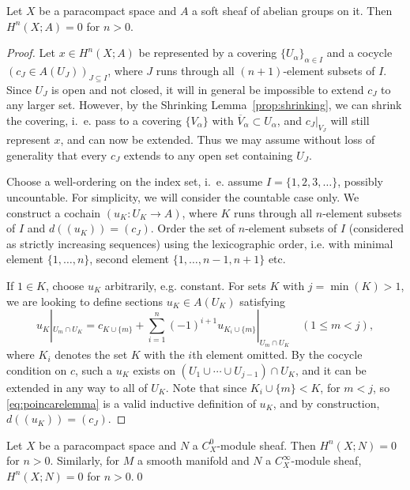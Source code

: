 \documentclass[a4paper,openany]{scrbook}
\begin{document}
\begin{prop}\label{prop:finesheafcohomology}
Let $X$ be a paracompact space and $A$ a soft sheaf of abelian groups on it. Then $H^n(X;A)=0$ for $n>0$.
\end{prop}
\begin{proof}
Let $x \in H^n(X;A)$ be represented by a covering $\{U_\alpha\}_{\alpha \in I}$ and a cocycle $(c_J \in A(U_J))_{J \subseteq I}$, where $J$ runs through all $(n+1)$-element subsets of $I$. Since $U_J$ is open and not closed, it will in general be impossible to extend $c_J$ to any larger set. However, by the Shrinking Lemma~\ref{prop:shrinking}, we can shrink the covering, i.~e. pass to a covering $\{V_\alpha\}$ with $\overline V_\alpha \subset U_\alpha$, and $c_J|_{V_J}$ will still represent $x$, and can now be extended. Thus we may assume without loss of generality that every $c_J$ extends to any open set containing $U_J$.

Choose a well-ordering on the index set, i.~e. assume $I=\{1,2,3,\dots\}$, possibly uncountable. For simplicity, we will consider the countable case only. We construct a cochain $(u_K\colon U_K \to A)$, where $K$ runs through all $n$-element subsets of $I$ and $d((u_K)) = (c_J)$. Order the set of $n$-element subsets of $I$ (considered as strictly increasing sequences) using the lexicographic order, i.e. with minimal element $\{1,\dots,n\}$, second element $\{1,\dots,n-1,n+1\}$ etc. 

If $1 \in K$, choose $u_K$ arbitrarily, e.g. constant. For sets $K$ with $j=\min(K)>1$, we are looking to define sections $u_K \in A(U_K)$ satisfying
\begin{equation}\label{eq:poincarelemma}
u_K|_{U_m \cap U_K} = c_{K\cup\{m\}}+\sum_{i=1}^{n} (-1)^{i+1} u_{K_i \cup \{m\}}|_{U_m \cap U_K} \quad (1 \leq m < j),
\end{equation}
where $K_i$ denotes the set $K$ with the $i$th element omitted. By the cocycle condition on $c$, such a $u_K$ exists on $(U_1 \cup \cdots \cup U_{j-1}) \cap U_K$, and it can be extended in any way to all of $U_K$. Note that since $K_i \cup \{m\} < K$, for $m<j$, so \eqref{eq:poincarelemma} is a valid inductive definition of $u_K$, and by construction, $d((u_K))=(c_J)$.
\end{proof}

\begin{corollary}\label{cor:Omodulecohomology}
Let $X$ be a paracompact space and $N$ a $C^0_X$-module sheaf. Then $H^n(X;N)=0$ for $n>0$. Similarly, for $M$ a smooth manifold and $N$ a $C^\infty_X$-module sheaf, $H^n(X;N)=0$ for $n>0$.\qed
\end{corollary}
\end{document}
